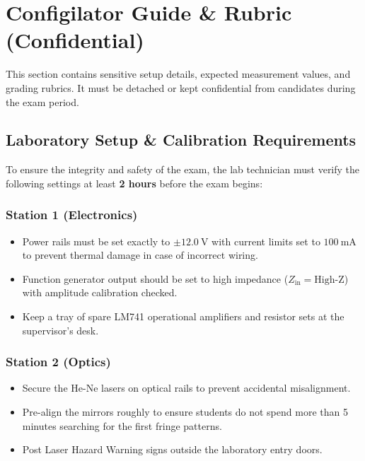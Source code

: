 \section{Configilator Guide \& Rubric (Confidential)}
\label{sec:invigilator}

\noindent
\begin{tcolorbox}[
    colback=accent!5,
    colframe=accent!80,
    boxrule=1.0pt,
    arc=4pt,
    title={\faLock\ CONFIDENTIAL --- FOR LAB STAFF \& INVIGILATORS ONLY},
    fonttitle=\sffamily\bfseries\color{white},
    coltitle=white,
    colbacktitle=accent,
    left=12pt, right=12pt, top=10pt, bottom=10pt
]
\sffamily\small
This section contains sensitive setup details, expected measurement values, and grading rubrics. It must be detached or kept confidential from candidates during the exam period.
\end{tcolorbox}

\subsection{Laboratory Setup \& Calibration Requirements}
To ensure the integrity and safety of the exam, the lab technician must verify the following settings at least \textbf{2 hours} before the exam begins:

\subsubsection{Station 1 (Electronics)}
\begin{itemize}[leftmargin=*, noitemsep]
    \item Power rails must be set exactly to $\pm\SI{12.0}{\volt}$ with current limits set to $\SI{100}{\milli\ampere}$ to prevent thermal damage in case of incorrect wiring.
    \item Function generator output should be set to high impedance ($Z_{\text{in}} = \text{High-Z}$) with amplitude calibration checked.
    \item Keep a tray of spare LM741 operational amplifiers and resistor sets at the supervisor's desk.
\end{itemize}

\subsubsection{Station 2 (Optics)}
\begin{itemize}[leftmargin=*, noitemsep]
    \item Secure the He-Ne lasers on optical rails to prevent accidental misalignment.
    \item Pre-align the mirrors roughly to ensure students do not spend more than 5 minutes searching for the first fringe patterns.
    \item Post Laser Hazard Warning signs outside the laboratory entry doors.
\end{itemize}

